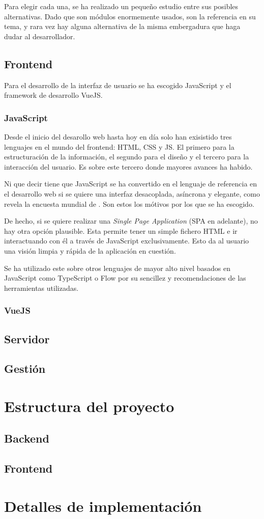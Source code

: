 Para elegir cada una, se ha realizado un pequeño estudio entre sus posibles alternativas. Dado que son módulos enormemente usados, son la referencia en su tema, y rara vez hay alguna alternativa de la misma embergadura que haga dudar al desarrollador.

\subsection{Frontend}
Para el desarrollo de la interfaz de usuario se ha escogido JavaScript y el framework de desarrollo VueJS.

\subsubsection{JavaScript}
Desde el inicio del desarollo web hasta hoy en día solo han exisistido tres lenguajes en el mundo del frontend: HTML, CSS y JS. El primero para la estructuración de la información, el segundo para el diseño y el tercero para la interacción del usuario. Es sobre este tercero donde mayores avances ha habido.

Ni que decir tiene que JavaScript se ha convertido en el lenguaje de referencia en el desarrollo web si se quiere una interfaz desacoplada, asíncrona y elegante, como revela la encuesta mundial de . Son estos los mótivos por los que se ha escogido.

De hecho, si se quiere realizar una \textit{Single Page Application} (SPA en adelante), no hay otra opción plausible. Esta permite tener un simple fichero HTML e ir interactuando con él a través de JavaScript exclusivamente. Esto da al usuario una visión limpia y rápida de la aplicación en cuestión.

Se ha utilizado este sobre otros lenguajes de mayor alto nivel basados en JavaScript como TypeScript o Flow por su sencillez y recomendaciones de las herramientas utilizadas.

\subsubsection{VueJS}


\subsection{Servidor}

\subsection{Gestión}

\section{Estructura del proyecto}\label{sec:estructra_proyecto}

\subsection{Backend}

\subsection{Frontend}

\section{Detalles de implementación}\label{sec:detalles_implementacion}